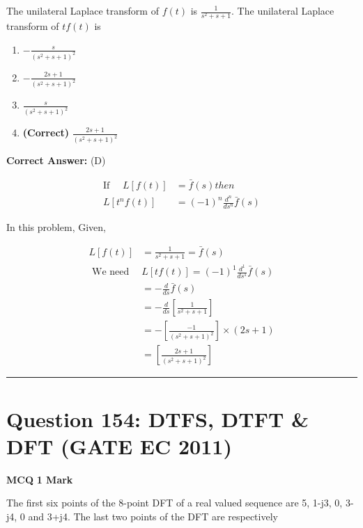 \documentclass[11pt,a4paper]{article}
\begin{document}
\noindent The unilateral Laplace transform of $f(t)$ is $\frac{1}{s^{2}+s+1}$. The unilateral Laplace transform of $t f(t)$ is


\begin{enumerate}[label=(\Alph*)]
    \item $-\frac{s}{(s^{2}+s+1)^{2}}$
    \item $-\frac{2s+1}{(s^{2}+s+1)^{2}}$
    \item $\frac{s}{(s^{2}+s+1)^{2}}$
    \item \textbf{(Correct)} $\frac{2s+1}{(s^{2}+s+1)^{2}}$
\end{enumerate}

\noindent \textbf{Correct Answer:} (D)

\begin{tcolorbox}[solbox, title=Detailed Solution -- Question 153]
\[
\begin{aligned} \text{If }\quad L[f(t)]&=\bar{f}(s) then\\ L\left[t^{n} f(t)\right]&=(-1)^{n} \frac{d^{n}}{d s^{n}} \bar{f}(s) \end{aligned}
\]

 In this problem, 
 Given,

\[
\begin{aligned} L[f(t)] &=\frac{1}{s^{2}+s+1}=\bar{f}(s) \\ \text { We need } & L[t f(t)]=(-1)^{1} \frac{d^{1}}{d s^{1}} \bar{f}(s) \\ &=-\frac{d}{d s} \bar{f}(s) \\ &=-\frac{d}{d s}\left[\frac{1}{s^{2}+s+1}\right] \\ &=-\left[\frac{-1}{\left(s^{2}+s+1\right)^{2}}\right] \times(2 s+1) \\ &=\left[\frac{2 s+1}{\left(s^{2}+s+1\right)^{2}}\right] \end{aligned}
\]
\end{tcolorbox}

\vspace{1.5em}
\hrule
\vspace{1.5em}

\section*{Question 154: DTFS, DTFT \& DFT (GATE EC 2011)}
\noindent \textbf{\color{primary}MCQ} \hfill \textbf{\color{secondary}1 Mark}


\noindent The first six points of the 8-point DFT of a real valued sequence are 5, 1-j3, 0, 3-j4, 0 and 3+j4. The last two points of the DFT are respectively
\end{document}
